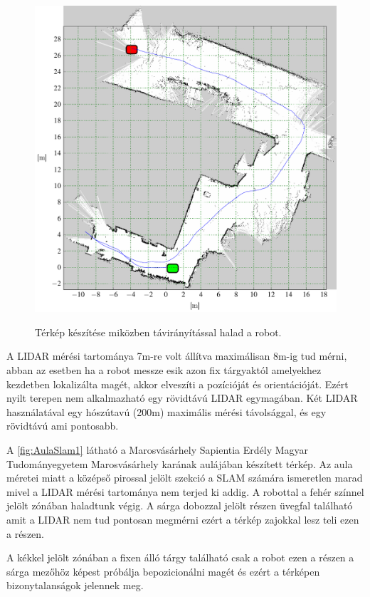 \begin{figure}[H]
  \includegraphics{tikz/hatsoudvarmap.pdf}
    \label{fig:hatsoudvarmap}
  \caption{Térkép készítése miközben távirányítással halad a robot.}
\end{figure}


A LIDAR mérési tartománya 7m-re volt állítva maximálisan 8m-ig tud mérni, abban az esetben ha a robot messze esik azon fix tárgyaktól amelyekhez kezdetben lokalizálta magét, akkor elveszíti a pozícióját és orientációját. Ezért nyilt terepen nem alkalmazható egy rövidtávú LIDAR egymagában. Két LIDAR használatával egy hószútavú (200m) maximális mérési távolsággal, és egy rövidtávú ami pontosabb. 

A \ref{fig:AulaSlam1} látható a Marosvásárhely Sapientia Erdély Magyar Tudományegyetem Marosvásárhely karának aulájában készített térkép. Az aula méretei miatt a középső pirossal jelölt szekció a SLAM számára ismeretlen marad mivel a LIDAR mérési tartománya nem terjed ki addig.
A robottal a fehér színnel jelölt zónában haladtunk végig. A sárga dobozzal jelölt részen üvegfal található amit a LIDAR nem tud pontosan megmérni ezért a térkép zajokkal lesz teli ezen a részen.

A kékkel jelölt zónában a fixen álló tárgy található csak a robot ezen a részen a sárga mezőhöz képest próbálja bepozicionálni magét és ezért a térképen bizonytalanságok jelennek meg.

